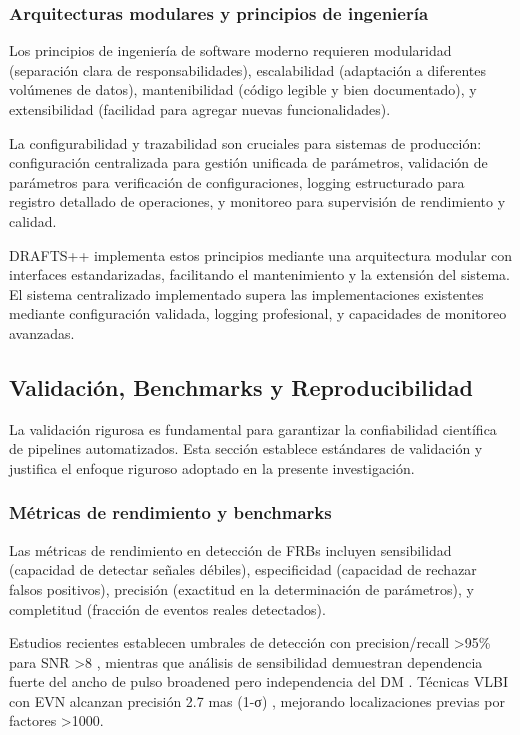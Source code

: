 \subsubsection{Arquitecturas modulares y principios de ingeniería}

Los principios de ingeniería de software moderno requieren modularidad (separación clara de responsabilidades), escalabilidad (adaptación a diferentes volúmenes de datos), mantenibilidad (código legible y bien documentado), y extensibilidad (facilidad para agregar nuevas funcionalidades).

La configurabilidad y trazabilidad son cruciales para sistemas de producción: configuración centralizada para gestión unificada de parámetros, validación de parámetros para verificación de configuraciones, logging estructurado para registro detallado de operaciones, y monitoreo para supervisión de rendimiento y calidad.

DRAFTS++ implementa estos principios mediante una arquitectura modular con interfaces estandarizadas, facilitando el mantenimiento y la extensión del sistema. El sistema centralizado implementado supera las implementaciones existentes mediante configuración validada, logging profesional, y capacidades de monitoreo avanzadas.

\subsection{Validación, Benchmarks y Reproducibilidad}

La validación rigurosa es fundamental para garantizar la confiabilidad científica de pipelines automatizados. Esta sección establece estándares de validación y justifica el enfoque riguroso adoptado en la presente investigación.

\subsubsection{Métricas de rendimiento y benchmarks}

Las métricas de rendimiento en detección de FRBs incluyen sensibilidad (capacidad de detectar señales débiles), especificidad (capacidad de rechazar falsos positivos), precisión (exactitud en la determinación de parámetros), y completitud (fracción de eventos reales detectados).

Estudios recientes establecen umbrales de detección con precision/recall >95\% para SNR >8 \cite{metrics2025}, mientras que análisis de sensibilidad demuestran dependencia fuerte del ancho de pulso broadened pero independencia del DM \cite{sensitivity2025}. Técnicas VLBI con EVN alcanzan precisión 2.7 mas (1-σ) \cite{vlbi2025}, mejorando localizaciones previas por factores >1000.

